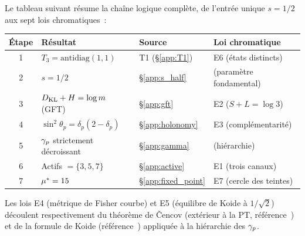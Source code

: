 \documentclass[12pt,a4paper]{article}
\begin{document}
Le tableau suivant r\'esume la cha\^ine logique compl\`ete, de
l'entr\'ee unique $s = 1/2$ aux sept lois chromatiques~:

\begin{center}
\small
\begin{tabular}{clll}
\toprule
\textbf{\'Etape} & \textbf{R\'esultat} & \textbf{Source} & \textbf{Loi chromatique} \\
\midrule
1 & $T_3 = \mathrm{antidiag}(1,1)$ & T1 (\S\ref{app:T1}) & E6 (\'etats distincts) \\
2 & $s = 1/2$ & \S\ref{app:s_half} & (param\`etre fondamental) \\
3 & $D_{\mathrm{KL}} + H = \log m$ (GFT) & \S\ref{app:gft} & E2 ($S + L = \log 3$) \\
4 & $\sin^2\!\theta_p = \delta_p(2-\delta_p)$ & \S\ref{app:holonomy} & E3 (compl\'ementarit\'e) \\
5 & $\gamma_{p}$ strictement d\'ecroissant & \S\ref{app:gamma} & (hi\'erarchie) \\
6 & Actifs $= \{3,5,7\}$ & \S\ref{app:active} & E1 (trois canaux) \\
7 & ${\mu^{*}} = 15$ & \S\ref{app:fixed_point} & E7 (cercle des teintes) \\
\bottomrule
\end{tabular}
\end{center}

\noindent
Les lois E4 (m\'etrique de Fisher courbe) et E5 (\'equilibre de Koide
\`a $1/\sqrt{2}$) d\'ecoulent respectivement du th\'eor\`eme de
\v{C}encov (ext\'erieur \`a la PT, r\'ef\'erence~\cite{cencov1982}) et
de la formule de Koide (r\'ef\'erence~\cite{koide1981}) appliqu\'ee
\`a la hi\'erarchie des $\gamma_{p}$.
\end{document}
